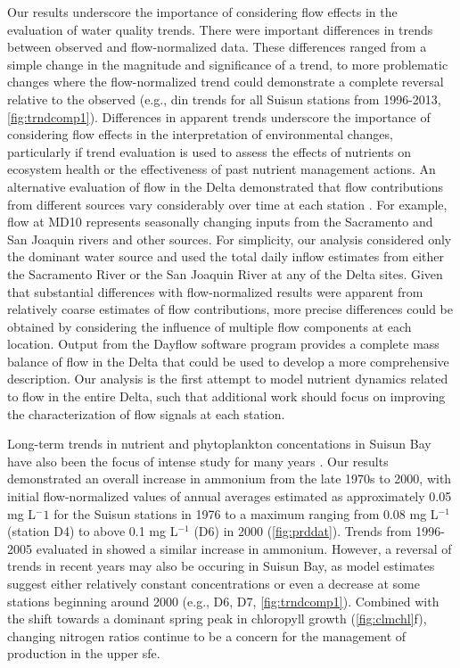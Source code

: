 \documentclass[letterpaper,12pt,oneside]{article}\usepackage[]{graphicx}\usepackage[]{color}
\begin{document}
Our results underscore the importance of considering flow effects in the evaluation of water quality trends. There were important differences in trends between observed and flow-normalized data. These differences ranged from a simple change in the magnitude and significance of a trend, to more problematic changes where the flow-normalized trend could demonstrate a complete reversal relative to the observed (e.g., \ac{din} trends for all Suisun stations from 1996-2013, \cref{fig:trndcomp1}). Differences in apparent trends underscore the importance of considering flow effects in the interpretation of environmental changes, particularly if trend evaluation is used to assess the effects of nutrients on ecosystem health or the effectiveness of past nutrient management actions. An alternative evaluation of flow in the Delta demonstrated that flow contributions from different sources vary considerably over time at each station \citep{Novick15}.  For example, flow at MD10 represents seasonally changing inputs from the Sacramento and San Joaquin rivers and other sources. For simplicity, our analysis considered only the dominant water source and used the total daily inflow estimates from either the Sacramento River or the San Joaquin River at any of the Delta sites. Given that substantial differences with flow-normalized results were apparent from relatively coarse estimates of flow contributions, more precise differences could be obtained by considering the influence of multiple flow components at each location. Output from the Dayflow software program \citep{IEP16} provides a complete mass balance of flow in the Delta that could be used to develop a more comprehensive description.  Our analysis is the first attempt to model nutrient dynamics related to flow in the entire Delta, such that additional work should focus on improving the characterization of flow signals at each station.

Long-term trends in nutrient and phytoplankton concentations in Suisun Bay have also been the focus of intense study for many years \citep{Cloern83,Lehman92,Dugdale07,Jassby08,Glibert14}. Our results demonstrated an overall increase in ammonium from the late 1970s to 2000, with initial flow-normalized values of annual averages estimated as approximately 0.05 mg L$^-1$ for the Suisun stations in 1976 to a maximum ranging from 0.08 mg L$^{-1}$ (station D4) to above 0.1 mg L$^{-1}$ (D6) in 2000 (\cref{fig:prddat}).  Trends from 1996-2005 evaluated in \citep{Jassby08} showed a similar increase in ammonium.  However, a reversal of trends in recent years may also be occuring in Suisun Bay, as model estimates suggest either relatively constant concentrations or even a decrease at some stations beginning around 2000 (e.g., D6, D7, \cref{fig:trndcomp1}).  Combined with the shift towards a dominant spring peak in chloropyll growth (\cref{fig:clmchl}f), changing nitrogen ratios continue to be a concern for the management of production in the upper \ac{sfe}. 
\end{document}
